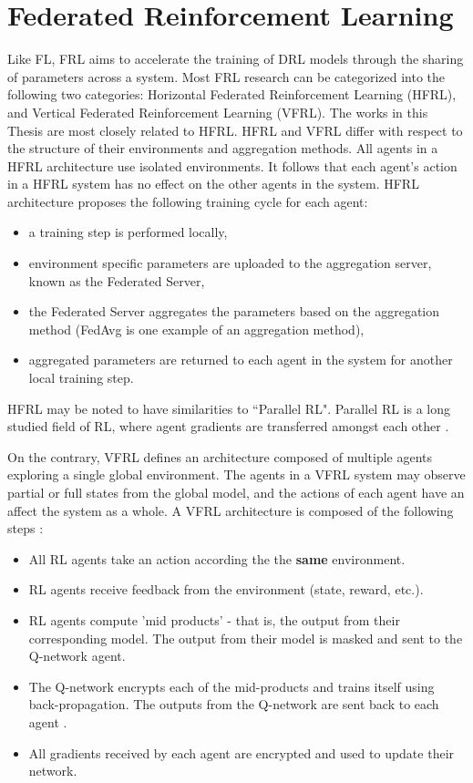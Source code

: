\section{Federated Reinforcement Learning}
Like FL, FRL aims to accelerate the training of DRL models through the sharing of parameters 
across a system. Most FRL research can be categorized into the following two categories: 
Horizontal Federated Reinforcement Learning (HFRL), and Vertical Federated Reinforcement 
Learning (VFRL).  The works in this Thesis are most closely related to HFRL.  HFRL and VFRL 
differ with respect to the structure of their environments and aggregation methods.  All 
agents in a HFRL architecture use isolated environments. It follows that each agent's action 
in a HFRL system has no effect on the other agents in the system.  HFRL architecture 
proposes the following training cycle for each agent: 

\begin{itemize}
    \item a training step is performed locally, 
    \item environment specific parameters are uploaded to the aggregation server, 
    known as the Federated Server,
    \item the Federated Server aggregates the parameters based on the aggregation 
    method (FedAvg is one example of an aggregation method),
    \item aggregated parameters are returned to each agent in the system for 
    another local training step.
\end{itemize} 

HFRL may be noted to have similarities to ``Parallel RL".  Parallel RL is a long studied 
field of RL, where agent gradients are transferred amongst each other 
\cite{Lim2020, Nadiger2019}.

On the contrary, VFRL defines an architecture composed 
of multiple agents exploring a single global environment. The agents in a VFRL system 
may observe partial or full states from the global model, and the actions of each agent 
have an affect the system as a whole. A VFRL architecture is composed of the following steps \cite{IntelAI19}:

\begin{itemize}
    \item All RL agents take an action according the the \textbf{same} environment.
    \item RL agents receive feedback from the environment (state, reward, etc.).
    \item RL agents compute 'mid products' - that is, the output from their corresponding model.  
    The output from their model is masked and sent to the Q-network agent.
    \item The Q-network encrypts each of the mid-products and trains itself using back-propagation. 
    The outputs from the Q-network are sent back to each agent \cite{IntelAI19}.
    \item All gradients received by each agent are encrypted and used to update their network.
\end{itemize}

